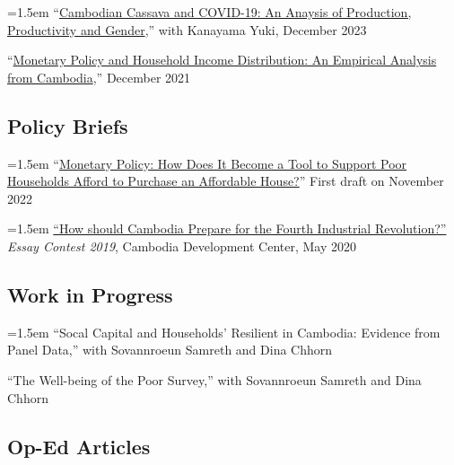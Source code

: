 \documentclass[10pt,a4paper]{article}
\begin{document}
	\hangindent=1.5em
	“\href{}{Cambodian Cassava and COVID-19: An Anaysis of Production, Productivity and Gender},” with Kanayama Yuki, December 2023\\ \vspace{-.5em}
	
	“\href{https://kosalnith.github.io/research/papers/MPHI.pdf}{Monetary Policy and Household Income Distribution: An Empirical Analysis from Cambodia},” December 2021 

\subsection*{Policy Briefs}
	
		\hangindent=1.5em
		“\href{}{Monetary Policy: How Does It Become a Tool to Support Poor Households Afford to Purchase an Affordable House?}” First draft on November 2022 \\ \vspace{-.5em}
	
		\hangindent=1.5em
		\href{https://cd-center.org/en/essay-contest-2019-first-place-winner/}{``How should Cambodia Prepare for the Fourth Industrial Revolution?''} \textit{Essay Contest 2019}, Cambodia Development Center, May 2020

\subsection*{Work in Progress}
	\hangindent=1.5em
	``Socal Capital and Households' Resilient in Cambodia: Evidence from Panel Data,'' with Sovannroeun Samreth and Dina Chhorn
	
	``The Well-being of the Poor Survey,'' with Sovannroeun Samreth and Dina Chhorn

\subsection*{Op-Ed Articles}
\end{document}

